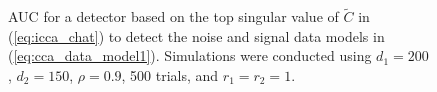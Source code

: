 \begin{figure}
  \caption{AUC for a detector based on the top singular value of $\widetilde{C}$ in
    (\ref{eq:icca_chat}) to detect the noise and signal data models in
    (\ref{eq:cca_data_model1}). Simulations were conducted using $d_1=200$, $d_2=150$,
    $\rho=0.9$, 500 trials, and $r_1=r_2=1$.}
  \label{fig:icca_auc_heatmap}
\end{figure}

